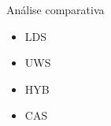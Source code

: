 \documentclass[final,t]{beamer}
\begin{document}
\begin{frame}{}
\begin{columns}[t]
\end{columns}

\begin{columns}[t]
\begin{column}{\linewidth}
\begin{exampleblock}{Análise comparativa}
\begin{itemize}
\item LDS
\item UWS
\item HYB
\item CAS
\end{itemize}
\end{exampleblock}

\end{column}
\end{columns}
\end{frame}
\end{document}
